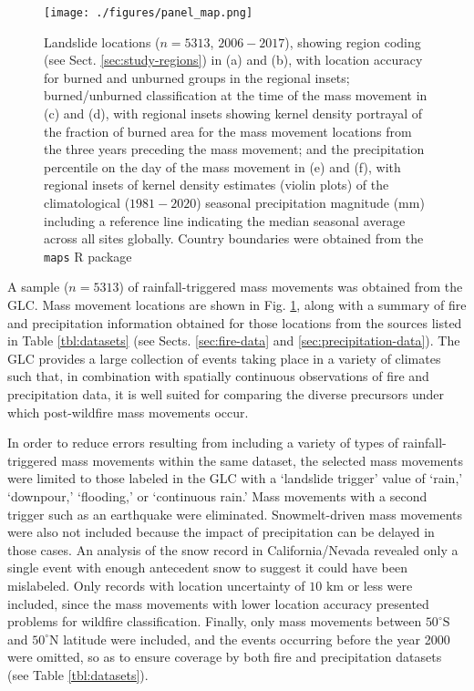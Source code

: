 \documentclass[nhess, manuscript]{copernicus}
\begin{document}
\begin{figure}
\centering
\texttt{[image: ./figures/panel\_map.png]}
\caption{Landslide locations (\(n=5313\), \(2006-2017\)),
showing region coding (see Sect. \ref{sec:study-regions}) in (a) and (b), with 
location accuracy for burned and unburned groups in the regional insets; 
burned/unburned classification at the time of the mass movement in (c) and (d),
with regional insets showing kernel density portrayal of the fraction 
of burned area for the mass movement locations from the three years 
preceding the mass movement; and the precipitation 
percentile on the day of the mass movement in (e) and (f), with regional insets 
of kernel density estimates (violin plots) of the climatological (\(1981-2020\)) 
seasonal precipitation magnitude (mm) including a reference line indicating the 
median seasonal average across all sites globally. Country boundaries were obtained from the \texttt{maps} R package \citep{deckmynMapsDrawGeographical2018}}
\label{fig:map}
\end{figure}

A sample (\(n=5313\)) of rainfall-triggered mass movements was obtained
from the GLC. Mass movement locations are shown in Fig. \ref{fig:map},
along with a summary of fire and precipitation information obtained for
those locations from the sources listed in Table \ref{tbl:datasets} (see
Sects. \ref{sec:fire-data} and \ref{sec:precipitation-data}). The GLC provides a large collection
of events taking place in a variety of climates such that, in
combination with spatially continuous observations of fire 
\citep[\(500 \text{m}\) Moderate Resolution Imaging Spectroradiometer {[}MODIS{]} Burned Area by][]{giglioCollectionMODISBurned2018} and precipitation 
\citep[5.5km Climate Hazards group InfraRed Precipitation with Station data {[}CHIRPS{]} by][]{funkClimateHazardsInfrared2015}
data, it is well suited for comparing the diverse precursors under which
post-wildfire mass movements occur.

In order to reduce errors resulting from including a variety of types of rainfall-triggered mass movements within the same dataset, the selected mass movements were limited to  those labeled in the GLC with a `landslide
trigger' value of `rain,' `downpour,' `flooding,' or `continuous rain.' Mass movements with a second trigger such as an earthquake were eliminated.
Snowmelt-driven mass movements were also not included because the impact of
precipitation can be delayed in those cases. An analysis of the snow record
in California/Nevada revealed only a single event with enough antecedent
snow to suggest it could have been mislabeled. Only records with location 
uncertainty of \(10 \text{ km}\) or less 
were included, since the mass movements with lower location accuracy presented
problems for wildfire classification. Finally, only mass movements
between \(50^{\circ}\text{S}\) and \(50^{\circ}\text{N}\) latitude were included, and the
events occurring before the year 2000 were omitted, so as to ensure
coverage by both fire and precipitation datasets (see
Table \ref{tbl:datasets}).
\end{document}
